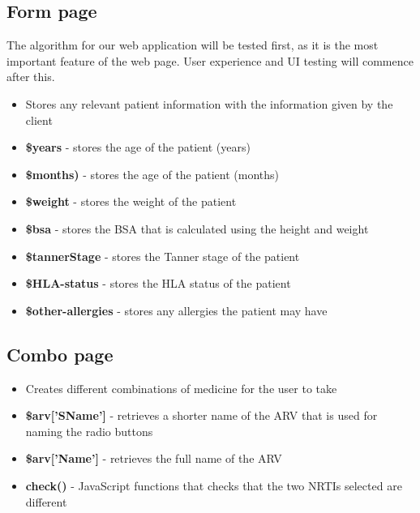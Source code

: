 \documentclass[12pt]{article}
\begin{document}
\subsection{Form page}
The algorithm for our web application will be tested first, as it is the most important feature of the web page. User experience and UI testing will commence after this.
\begin{itemize}
\item Stores any relevant patient information with the information given by the client
\item \textbf {\$years} - stores the age of the patient (years)
\item \textbf{\$months)} - stores the age of the patient (months)
\item \textbf{\$weight} - stores the weight of the patient
\item \textbf{\$bsa} - stores the BSA that is calculated using the height and weight
\item \textbf{\$tannerStage} - stores the Tanner stage of the patient
\item \textbf{\$HLA-status} - stores the HLA status of the patient
\item \textbf{\$other-allergies} - stores any allergies the patient may have
\end{itemize}

\subsection{Combo page}
\begin{itemize}
\item Creates different combinations of medicine for the user to take
\item \textbf{\$arv['SName']} - retrieves a shorter name of the ARV that is used for naming the radio buttons
\item \textbf{\$arv['Name']} - retrieves the full name of the ARV
\item \textbf{check()} - JavaScript functions that checks that the two NRTIs selected are different
\end{itemize}
\end{document}
